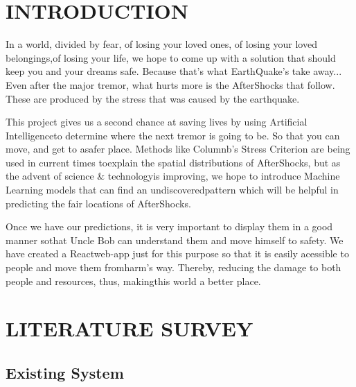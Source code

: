 \documentclass[14pt]{extarticle}
\begin{document}
\newpage
\section{INTRODUCTION}

\par In a world, divided by fear, of losing your loved ones, of losing your loved belongings,of losing your life, we hope to come up with a solution that should keep you and your dreams safe. Because that's what EarthQuake's take away... Even after the major tremor, what hurts more is the AfterShocks that follow. These are produced by the stress that was caused by the earthquake.

\par This project gives us a second chance at saving lives by using Artificial Intelligenceto determine where the next tremor is going to be. So that you can move, and get to asafer place. Methods like Columnb's Stress Criterion are being used in current times toexplain the spatial distributions of AfterShocks, but as the advent of science \& technologyis improving, we hope to introduce Machine Learning models that can find an undiscoveredpattern which will be helpful in predicting the fair locations of AfterShocks.

\par Once we have our predictions, it is very important to display them in a good manner sothat Uncle Bob can understand them and move himself to safety. We have created a Reactweb-app just for this purpose so that it is easily acessible to people and move them fromharm's way. Thereby, reducing the damage to both people and resources, thus, makingthis world a better place.



\newpage
\section{LITERATURE SURVEY}
\subsection{Existing System}
\end{document}

